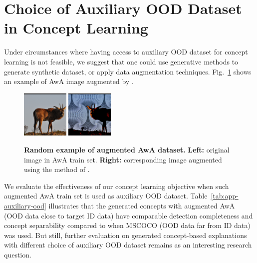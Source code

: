 \section{Choice of Auxiliary OOD Dataset in Concept Learning}
\label{app:auxiliary-ood}

Under circumstances where having access to auxiliary OOD dataset for concept learning is not feasible, we suggest that one could use generative methods to generate synthetic dataset, or apply data augmentation techniques. Fig.~\ref{fig:app-augAwA} shows an example of AwA image augmented by \citet{hendrycks2022pixmix}. 

\begin{figure}[hbt]
\centering
{\includegraphics[width=0.2\textwidth]{figures/appendix/9_orig.png}} \hspace{2mm}
{\includegraphics[width=0.2\textwidth]{figures/appendix/9.png}}
\caption{\textbf{Random example of augmented AwA dataset.} 
\textbf{Left:} original image in AwA train set.
\textbf{Right:} corresponding image augmented using the method of \citet{hendrycks2022pixmix}.} 
\label{fig:app-augAwA}
\end{figure}

We evaluate the effectiveness of our concept learning objective when such augmented AwA train set is used as auxiliary OOD dataset.
Table~\ref{tab:app-auxiliary-ood} illustrates that the generated concepts with augmented AwA (\ie OOD data close to target ID data) have comparable detection completeness and concept separability compared to when MSCOCO (\ie OOD data far from ID data) was used.
But still, further evaluation on generated concept-based explanations with different choice of auxiliary OOD dataset remains as an interesting research question.

